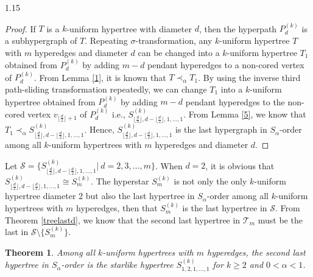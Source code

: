 \documentclass[preprint,12pt]{elsarticle1}
\newtheorem{thm}{Theorem}[section]
\numberwithin{equation}{section}
\begin{document}
\begin{spacing}{1.15}
\begin{proof}
If $T$ is a $k$-uniform hypertree with diameter $d$, then the hyperpath $P_d^{(k)}$ is a subhypergraph of $T$. Repeating $\sigma$-transformation, any $k$-uniform hypertree $T$ with $m$ hyperedges and diameter $d$ can be changed into a $k$-uniform hypertree $T_1$ obtained from $P_{d}^{(k)}$ by adding $m-d$ pendant hyperedges to a non-cored vertex of $P_{d}^{(k)}$. From Lemma \ref{1},
it is known that $T\prec_{\alpha}T_1$. By using the inverse third path-sliding transformation repeatedly, we can change $T_1$ into a $k$-uniform hypertree obtained from $P_{d}^{(k)}$ by adding $m-d$ pendant hyperedges to the non-cored vertex $v_{\lfloor \frac{d}{2} \rfloor+1}$ of $P_{d}^{(k)}$ i.e., $S_{\lfloor\frac{d}{2}\rfloor,d-\lfloor\frac{d}{2}\rfloor,1,\ldots,1}^{(k)}$. From Lemma \ref{5}, we know that $T_1\prec_{\alpha}S_{\lfloor\frac{d}{2}\rfloor,d-\lfloor\frac{d}{2}\rfloor,1,\ldots,1}^{(k)}$. Hence, $S_{\lfloor\frac{d}{2}\rfloor,d-\lfloor\frac{d}{2}\rfloor,1,\ldots,1}^{(k)}$ is the last hypergraph in $S_{\alpha}$-order among all $k$-uniform hypertrees with $m$ hyperedges and diameter $d$.
\end{proof}

Let $\mathcal{S}=\{S_{\lfloor\frac{d}{2}\rfloor,d-\lfloor\frac{d}{2}\rfloor,1,\ldots,1}^{(k)}|\ d=2,3,\ldots,m\}$.
When $d=2$, it is obvious that $S_{\lfloor\frac{d}{2}\rfloor,d-\lfloor\frac{d}{2}\rfloor,1,\ldots,1}^{(k)}\cong S_{m}^{(k)}$.
The hyperstar $S_{m}^{(k)}$ is not only the only $k$-uniform hypertree diameter $2$ but also the last hypertree in $S_{\alpha}$-order among all $k$-uniform hypertrees with $m$ hyperedges, then that $S_{m}^{(k)}$ is the last hypertree in $\mathcal{S}$. From Theorem \ref{treelastd}, we know that the second last hypertree in $\mathcal{T}_{m}$ must be the last in $\mathcal{S}\setminus\{S_{m}^{(k)}\}$.

\begin{thm}\label{lastsecondtree}
Among all $k$-uniform hypertrees with $m$ hyperedges, the second last hypertree in $S_{\alpha}$-order is the starlike hypertree $S_{1,2,1,\ldots,1}^{(k)}$ for $k\ge2$ and $0<\alpha<1$.
\end{thm}


\end{spacing}
\end{document}
